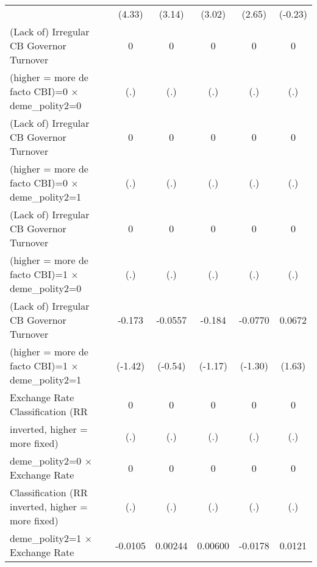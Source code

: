 {\begin{tabular}{l*{5}{c}}
                                        &    (4.33)         &    (3.14)         &    (3.02)         &    (2.65)         &   (-0.23)         \\
\addlinespace
(Lack of) Irregular CB Governor Turnover&         0         &         0         &         0         &         0         &         0         \\
(higher = more de facto CBI)=0 $\times$ deme\_polity2=0&       (.)         &       (.)         &       (.)         &       (.)         &       (.)         \\
\addlinespace
(Lack of) Irregular CB Governor Turnover&         0         &         0         &         0         &         0         &         0         \\
(higher = more de facto CBI)=0 $\times$ deme\_polity2=1&       (.)         &       (.)         &       (.)         &       (.)         &       (.)         \\
\addlinespace
(Lack of) Irregular CB Governor Turnover&         0         &         0         &         0         &         0         &         0         \\
(higher = more de facto CBI)=1 $\times$ deme\_polity2=0&       (.)         &       (.)         &       (.)         &       (.)         &       (.)         \\
\addlinespace
(Lack of) Irregular CB Governor Turnover&    -0.173         &   -0.0557         &    -0.184         &   -0.0770         &    0.0672         \\
(higher = more de facto CBI)=1 $\times$ deme\_polity2=1&   (-1.42)         &   (-0.54)         &   (-1.17)         &   (-1.30)         &    (1.63)         \\
\addlinespace
Exchange Rate Classification (RR        &         0         &         0         &         0         &         0         &         0         \\
inverted, higher = more fixed)          &       (.)         &       (.)         &       (.)         &       (.)         &       (.)         \\
\addlinespace
deme\_polity2=0 $\times$ Exchange Rate   &         0         &         0         &         0         &         0         &         0         \\
Classification (RR inverted, higher = more fixed)&       (.)         &       (.)         &       (.)         &       (.)         &       (.)         \\
\addlinespace
deme\_polity2=1 $\times$ Exchange Rate   &   -0.0105         &   0.00244         &   0.00600         &   -0.0178         &    0.0121         \\

\end{tabular}}
